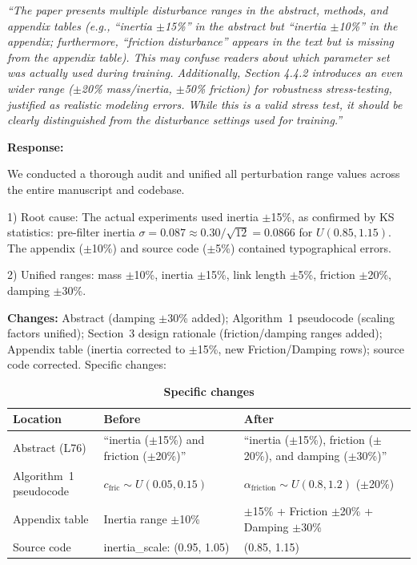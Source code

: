 \documentclass[11pt,a4paper]{article}
\newcommand{\reviewercomment}[1]{\medskip\noindent\textit{``#1''}\medskip}
\newcommand{\response}{\noindent\textbf{Response:}\par\noindent}
\begin{document}
\reviewercomment{The paper presents multiple disturbance ranges in the abstract, methods, and appendix tables (e.g., ``inertia $\pm$15\%'' in the abstract but ``inertia $\pm$10\%'' in the appendix; furthermore, ``friction disturbance'' appears in the text but is missing from the appendix table). This may confuse readers about which parameter set was actually used during training. Additionally, Section 4.4.2 introduces an even wider range ($\pm$20\% mass/inertia, $\pm$50\% friction) for robustness stress-testing, justified as realistic modeling errors. While this is a valid stress test, it should be clearly distinguished from the disturbance settings used for training.}

\response
We conducted a thorough audit and unified all perturbation range values across the entire manuscript and codebase.

1) Root cause: The actual experiments used inertia $\pm$15\%, as confirmed by KS statistics: pre-filter inertia $\sigma = 0.087 \approx 0.30/\sqrt{12} = 0.0866$ for $U(0.85, 1.15)$. The appendix ($\pm$10\%) and source code ($\pm$5\%) contained typographical errors.

2) Unified ranges: mass $\pm$10\%, inertia $\pm$15\%, link length $\pm$5\%, friction $\pm$20\%, damping $\pm$30\%.

\textbf{Changes:} Abstract (damping $\pm$30\% added); Algorithm~1 pseudocode (scaling factors unified); Section~3 design rationale (friction/damping ranges added); Appendix table (inertia corrected to $\pm$15\%, new Friction/Damping rows); source code corrected. Specific changes:

\begin{table}[h]
\centering\small
\caption*{\textbf{Specific changes}}
\begin{tabular}{p{}p{}p{}}
\toprule
Location & Before & After \\
\midrule
Abstract (L76) & ``inertia ($\pm$15\%) and friction ($\pm$20\%)'' & ``inertia ($\pm$15\%), friction ($\pm$20\%), and damping ($\pm$30\%)'' \\
Algorithm~1 pseudocode & $c_{\mathrm{fric}} \sim U(0.05,0.15)$ & $\alpha_{\mathrm{friction}} \sim U(0.8,1.2)$ ($\pm$20\%) \\
Appendix table & Inertia range $\pm$10\% & $\pm$15\% + Friction $\pm$20\% + Damping $\pm$30\% \\
Source code & inertia\_scale: (0.95, 1.05) & (0.85, 1.15) \\
\bottomrule
\end{tabular}
\end{table}
\end{document}
